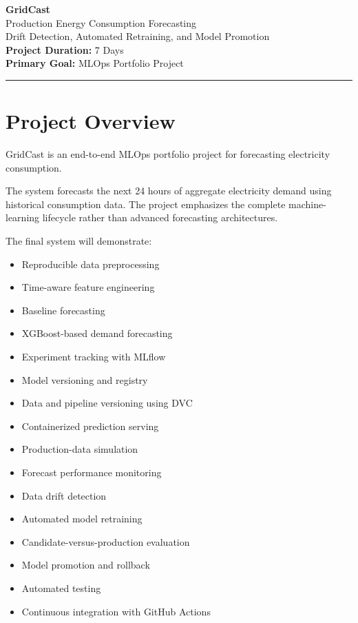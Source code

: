 \documentclass[11pt,a4paper]{article}
\newcommand{\projectname}{GridCast}
\begin{document}
\begin{center}
    {\Huge \bfseries \projectname}\\[0.3cm]
    {\Large Production Energy Consumption Forecasting}\\[0.15cm]
    {\large Drift Detection, Automated Retraining, and Model Promotion}\\[0.6cm]

    \textbf{Project Duration:} 7 Days\\
    \textbf{Primary Goal:} MLOps Portfolio Project
\end{center}

\vspace{0.5cm}

\hrule

\vspace{0.5cm}

\section{Project Overview}

\projectname{} is an end-to-end MLOps portfolio project for forecasting electricity consumption.

The system forecasts the next 24 hours of aggregate electricity demand using historical consumption data. The project emphasizes the complete machine-learning lifecycle rather than advanced forecasting architectures.

The final system will demonstrate:

\begin{itemize}
    \item Reproducible data preprocessing
    \item Time-aware feature engineering
    \item Baseline forecasting
    \item XGBoost-based demand forecasting
    \item Experiment tracking with MLflow
    \item Model versioning and registry
    \item Data and pipeline versioning using DVC
    \item Containerized prediction serving
    \item Production-data simulation
    \item Forecast performance monitoring
    \item Data drift detection
    \item Automated model retraining
    \item Candidate-versus-production evaluation
    \item Model promotion and rollback
    \item Automated testing
    \item Continuous integration with GitHub Actions
\end{itemize}
\end{document}
